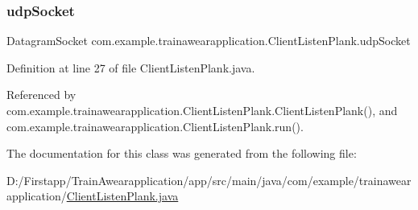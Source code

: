 \subsubsection{\texorpdfstring{udpSocket}{udpSocket}}
{\footnotesize\ttfamily Datagram\+Socket com.\+example.\+trainawearapplication.\+Client\+Listen\+Plank.\+udp\+Socket\hspace{0.3cm}{\ttfamily [private]}}



Definition at line 27 of file Client\+Listen\+Plank.\+java.



Referenced by com.\+example.\+trainawearapplication.\+Client\+Listen\+Plank.\+Client\+Listen\+Plank(), and com.\+example.\+trainawearapplication.\+Client\+Listen\+Plank.\+run().



The documentation for this class was generated from the following file\+:\begin{DoxyCompactItemize}
\item 
D\+:/\+Firstapp/\+Train\+Awearapplication/app/src/main/java/com/example/trainawearapplication/\mbox{\hyperlink{_client_listen_plank_8java}{Client\+Listen\+Plank.\+java}}\end{DoxyCompactItemize}
